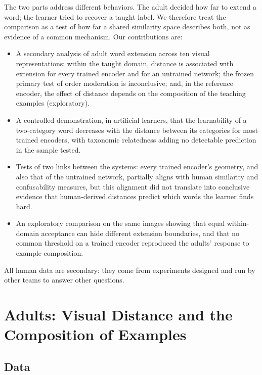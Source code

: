 \documentclass[11pt]{article}
\begin{document}
The two parts address different behaviors. The adult decided how far to extend a word; the learner tried to recover a taught label. We therefore treat the comparison as a test of how far a shared similarity space describes both, not as evidence of a common mechanism. Our contributions are:
\begin{itemize}
\item A secondary analysis of adult word extension across ten visual representations: within the taught domain, distance is associated with extension for every trained encoder and for an untrained network; the frozen primary test of order moderation is inconclusive; and, in the reference encoder, the effect of distance depends on the composition of the teaching examples (exploratory).
\item A controlled demonstration, in artificial learners, that the learnability of a two-category word decreases with the distance between its categories for most trained encoders, with taxonomic relatedness adding no detectable prediction in the sample tested.
\item Tests of two links between the systems: every trained encoder's geometry, and also that of the untrained network, partially aligns with human similarity and confusability measures, but this alignment did not translate into conclusive evidence that human-derived distances predict which words the learner finds hard.
\item An exploratory comparison on the same images showing that equal within-domain acceptance can hide different extension boundaries, and that no common threshold on a trained encoder reproduced the adults' response to example composition.
\end{itemize}

All human data are secondary: they come from experiments designed and run by other teams to answer other questions.

\section{Adults: Visual Distance and the Composition of Examples}
\label{sec:adults}

\subsection{Data}
\end{document}

